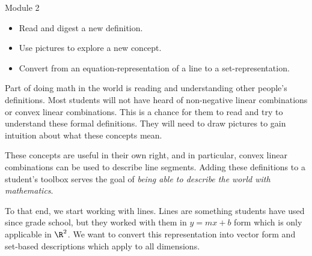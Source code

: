 \begin{lesson}

	Module 2

	\begin{itemize}
		\item Read and digest a new definition.

		\item Use pictures to explore a new concept.

		\item Convert from an equation-representation of a line to a set-representation.
	\end{itemize}

	 Part of doing math in the world is reading and understanding
	other people's definitions. Most students will not have heard of non-negative
	linear combinations or convex linear combinations. This is a chance for them
	to read and try to understand these formal definitions. They will need to
	draw pictures to gain intuition about what these concepts mean.

	These concepts are useful in their own right, and in particular, convex linear
	combinations can be used to describe line segments. Adding these definitions
	to a student's toolbox serves the goal of \emph{being able to describe
	the world with mathematics}.

	To that end, we start working with lines. Lines are something students have
	used since grade school, but they worked with them in $y=mx+b$ form which
	is only applicable in $\R^{2}$. We want to convert this representation
	into vector form and set-based descriptions which apply to all
	dimensions.

\end{lesson}

	\displayonlynewpage

